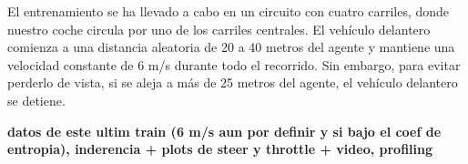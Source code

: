 El entrenamiento se ha llevado a cabo en un circuito con cuatro carriles, donde nuestro coche circula por uno de los carriles centrales. El vehículo delantero comienza a una distancia aleatoria de 20 a 40 metros del agente y mantiene una velocidad constante de 6 m/s durante todo el recorrido. Sin embargo, para evitar perderlo de vista, si se aleja a más de 25 metros del agente, el vehículo delantero se detiene.

\textbf{datos de este ultim train (6 m/s aun por definir y si bajo el coef de entropia), inderencia + plots de steer y throttle + video, profiling}